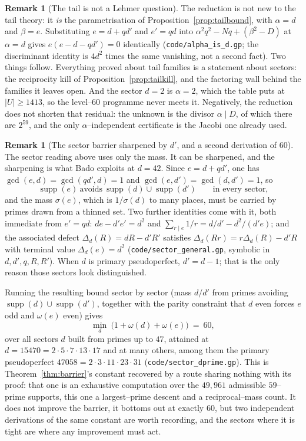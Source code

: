 \documentclass[11pt]{article}
\theoremstyle{definition}
\newtheorem{remark}[theorem]{Remark}
\begin{document}
\begin{remark}[The tail is not a Lehmer question]
The reduction is not new to the tail theory: it \emph{is} the parametrisation of
Proposition~\ref{prop:tailbound}, with $\alpha=d$ and $\beta=e$. Substituting $e=d+qd'$ and $e'=qd$
into $\alpha^2q^2-Nq+(\beta^2-D)$ at $\alpha=d$ gives $e(e-d-qd')=0$ identically
\textup{(\texttt{code/alpha\_is\_d.gp}; the discriminant identity is $4d^2$ times the same
vanishing, not a second fact)}. Two things follow. Everything proved about tail families is
a statement about sectors: the reciprocity kill of Proposition~\ref{prop:tailkill}, and the
factoring wall behind the families it leaves open. And the sector $d=2$ is $\alpha=2$, which the
table puts at $|U|\ge1413$, so the level--$60$ programme never meets it. Negatively, the reduction
does not shorten that residual: the unknown is the divisor $\alpha\mid D$, of which there are
$2^{59}$, and the only $\alpha$--independent certificate is the Jacobi one already used.


\begin{remark}[The sector barrier sharpened by $d'$, and a second derivation of $60$]\label{rem:sectordprime}
The sector reading above uses only the mass. It can be sharpened, and the sharpening is what
Bado \cite{Bado2026b} exploits at $d=42$. Since $e=d+qd'$, one has $\gcd(e,d)=\gcd(qd',d)=1$ and
$\gcd(e,d')=\gcd(d,d')=1$, so
\[ \operatorname{supp}(e)\ \text{avoids}\ \operatorname{supp}(d)\cup\operatorname{supp}(d')
   \qquad\text{in every sector,} \]
and the mass $\sigma(e)$, which is $1/\sigma(d)$ to many places, must be carried by primes drawn
from a thinned set. Two further identities come with it, both immediate from $e'=qd$:
$de-d'e'=d^2$ and $\sum_{r\mid e}1/r=d/d'-d^2/(d'e)$; and the associated defect
$\Delta_d(R)=dR-d'R'$ satisfies $\Delta_d(Rr)=r\Delta_d(R)-d'R$ with terminal value
$\Delta_d(e)=d^2$ \textup{(\texttt{code/sector\_general.gp}, symbolic in $d,d',q,R,R'$)}. When $d$
is primary pseudoperfect, $d'=d-1$; that is the only reason those sectors look distinguished.

Running the resulting bound sector by sector (mass $d/d'$ from primes avoiding
$\operatorname{supp}(d)\cup\operatorname{supp}(d')$, together with the parity constraint that $d$
even forces $e$ odd and $\omega(e)$ even) gives
\[ \min_{d}\ \bigl(1+\omega(d)+\omega(e)\bigr)\ =\ 60, \]
over all sectors $d$ built from primes up to $47$, attained at $d=15470=2\cdot5\cdot7\cdot13\cdot17$
and at many others, among them the primary pseudoperfect $47058=2\cdot3\cdot11\cdot23\cdot31$
\textup{(\texttt{code/sector\_dprime.gp})}. This is Theorem~\ref{thm:barrier}'s constant recovered
by a route sharing nothing with its proof: that one is an exhaustive computation over the $49{,}961$
admissible $59$--prime supports, this one a largest--prime descent and a reciprocal--mass count. It
does not improve the barrier, it bottoms out at exactly $60$, but two independent derivations
of the same constant are worth recording, and the sectors where it is tight are where any
improvement must act.


\end{remark}
\end{remark}
\end{document}
